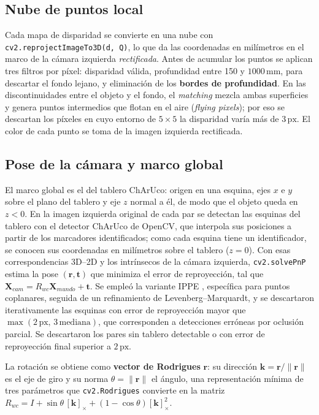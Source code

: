 \documentclass[10pt,a4paper,twocolumn]{article}
\newcommand{\px}{\,\mathrm{px}}
\newcommand{\mm}{\,\mathrm{mm}}
\newcommand{\code}[1]{\texttt{#1}}
\begin{document}
\subsection{Nube de puntos local}
\label{sec:met-local}

Cada mapa de disparidad se convierte en una nube con \code{cv2.reprojectImageTo3D(d, Q)}, lo que da las coordenadas en milímetros en el marco de la cámara izquierda \emph{rectificada}. Antes de acumular los puntos se aplican tres filtros por píxel: disparidad válida, profundidad entre 150 y $1000\mm$, para descartar el fondo lejano, y eliminación de los \textbf{bordes de profundidad}. En las discontinuidades entre el objeto y el fondo, el \emph{matching} mezcla ambas superficies y genera puntos intermedios que flotan en el aire (\emph{flying pixels}); por eso se descartan los píxeles en cuyo entorno de $5\times5$ la disparidad varía más de $3\px$. El color de cada punto se toma de la imagen izquierda rectificada.

\subsection{Pose de la cámara y marco global}
\label{sec:met-pose}

El marco global es el del tablero ChArUco: origen en una esquina, ejes $x$ e $y$ sobre el plano del tablero y eje $z$ normal a él, de modo que el objeto queda en $z<0$. En la imagen izquierda original de cada par se detectan las esquinas del tablero con el detector ChArUco de OpenCV, que interpola sus posiciones a partir de los marcadores identificados; como cada esquina tiene un identificador, se conocen sus coordenadas en milímetros sobre el tablero ($z=0$). Con esas correspondencias 3D--2D y los intrínsecos de la cámara izquierda, \code{cv2.solvePnP} estima la pose $(\mathbf{r},\mathbf{t})$ que minimiza el error de reproyección, tal que $\mathbf{X}_{cam}=R_{wc}\mathbf{X}_{mundo}+\mathbf{t}$. Se empleó la variante IPPE \cite{ippe}, específica para puntos coplanares, seguida de un refinamiento de Levenberg--Marquardt, y se descartaron iterativamente las esquinas con error de reproyección mayor que $\max(2\px,\,3\,\mathrm{mediana})$, que corresponden a detecciones erróneas por oclusión parcial. Se descartaron los pares sin tablero detectable o con error de reproyección final superior a $2\px$.

La rotación se obtiene como \textbf{vector de Rodrigues} $\mathbf{r}$: su dirección $\mathbf{k}=\mathbf{r}/\lVert\mathbf{r}\rVert$ es el eje de giro y su norma $\theta=\lVert\mathbf{r}\rVert$ el ángulo, una representación mínima de tres parámetros que \code{cv2.Rodrigues} convierte en la matriz $R_{wc}=I+\sin\theta\,[\mathbf{k}]_\times+(1-\cos\theta)[\mathbf{k}]_\times^2$.
\end{document}
